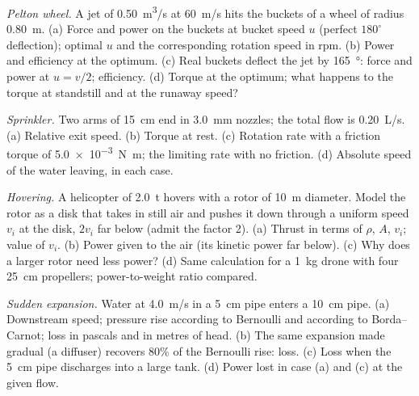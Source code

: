 \begin{exercise}[$\star\star$]\label{exo:b2:flow-balances:5}
\emph{Pelton wheel.} A jet of \qty{0.50}{m^3/s} at \qty{60}{m/s} hits the
buckets of a wheel of radius \qty{0.80}{m}. (a) Force and power on the
buckets at bucket speed $u$ (perfect $180^\circ$ deflection); optimal $u$
and the corresponding rotation speed in rpm. (b) Power and efficiency
at the optimum. (c) Real buckets deflect the jet by \qty{165}{\degree}:
force and power at $u = v/2$; efficiency. (d) Torque at the optimum;
what happens to the torque at standstill and at the runaway speed?
\end{exercise}

\begin{exercise}[$\star\star$]\label{exo:b2:flow-balances:6}
\emph{Sprinkler.} Two arms of \qty{15}{cm} end in \qty{3.0}{mm} nozzles;
the total flow is \qty{0.20}{L/s}. (a) Relative exit speed. (b) Torque at
rest. (c) Rotation rate with a  friction torque of
\qty{5.0e-3}{N.m}; the limiting rate with no friction. (d) Absolute speed
of the water leaving, in each case.
\end{exercise}

\begin{exercise}[$\star\star$]\label{exo:b2:flow-balances:7}
\emph{Hovering.} A helicopter of \qty{2.0}{t} hovers with a rotor of
\qty{10}{m} diameter. Model the rotor as a disk that takes in still air
and pushes it down through a uniform speed $v_i$ at the disk, $2v_i$ far
below (admit the factor 2). (a) Thrust in terms of $\rho$, $A$, $v_i$;
value of $v_i$. (b) Power given to the air (its kinetic power far
below). (c) Why does a larger rotor need less power? (d) Same
calculation for a \qty{1}{kg} drone with four \qty{25}{cm} propellers;
power-to-weight ratio compared.
\end{exercise}

\begin{exercise}[$\star\star$]\label{exo:b2:flow-balances:8}
\emph{Sudden expansion.} Water at \qty{4.0}{m/s} in a \qty{5}{cm} pipe enters
a \qty{10}{cm} pipe. (a) Downstream speed; pressure rise according to
Bernoulli and according to Borda--Carnot; loss in pascals and in metres
of head. (b) The same expansion made gradual (a diffuser) recovers $80\%$
of the Bernoulli rise: loss. (c) Loss when the \qty{5}{cm} pipe discharges
into a large tank. (d) Power lost in case (a) and (c) at the given flow.
\end{exercise}

